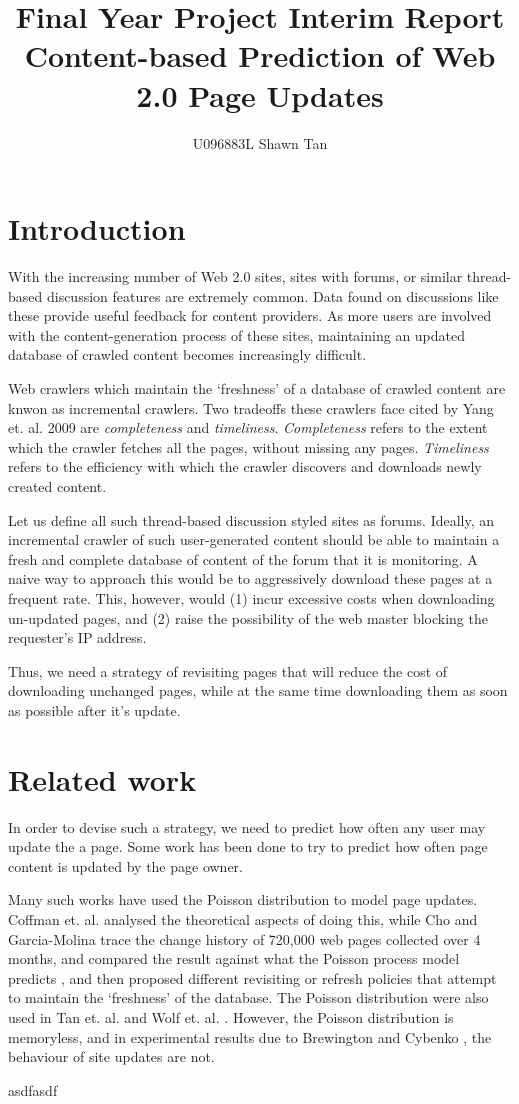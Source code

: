 \documentclass{article}
\title{Final Year Project Interim Report\\ Content-based Prediction of Web 2.0 Page Updates}
\author{U096883L Shawn Tan}
\date{}
\begin{document}
\maketitle
\section{Introduction}
With the increasing number of Web 2.0 sites, sites with forums, or similar thread-based discussion features are extremely common. Data found on discussions like these provide useful feedback for content providers. As more users are involved with the content-generation process of these sites, maintaining an updated database of crawled content becomes increasingly difficult.

Web crawlers which maintain the `freshness' of a database of crawled content are knwon as incremental crawlers. Two tradeoffs these crawlers face cited by Yang et. al. 2009 \cite{Yang2009} are \emph{completeness} and \emph{timeliness}. \emph{Completeness} refers to the extent which the crawler fetches all the pages, without missing any pages. \emph{Timeliness} refers to the efficiency with which the crawler discovers and downloads newly created content.

Let us define all such thread-based discussion styled sites as forums. Ideally, an incremental crawler of such user-generated content should be able to maintain a fresh and complete database of content of the forum that it is monitoring. A naive way to approach this would be to aggressively download these pages at a frequent rate. This, however, would (1) incur excessive costs when downloading un-updated pages, and (2) raise the possibility of the web master blocking the requester's IP address.

Thus, we need a strategy of revisiting pages that will reduce the cost of downloading unchanged pages, while at the same time downloading them as soon as possible after it's update.

\section{Related work}
In order to devise such a strategy, we need to predict how often any user may update the a page. Some work has been done to try to predict how often page content is updated by the page owner.

Many such works have used the Poisson distribution to model page updates. Coffman et. al. \cite{Coffman1997} analysed the theoretical aspects of doing this, while Cho and Garcia-Molina trace the change history of 720,000 web pages collected over 4 months, and compared the result against what the Poisson process model predicts \cite{Cho1999}, and then proposed different revisiting or refresh policies \cite{Cho2003,Garcia-molina2003} that attempt to maintain the `freshness' of the database. The Poisson distribution were also used in Tan et. al. \cite{Tan2007} and Wolf et. al. \cite{Wolf2002}. However, the Poisson distribution is memoryless, and in experimental results due to Brewington and Cybenko \cite{Brian2000}, the behaviour of site updates are not.

asdfasdf




\end{document}
